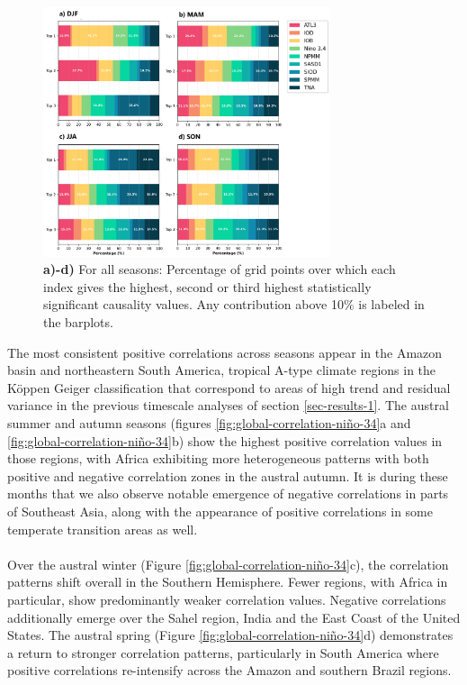 \documentclass[10pt,twocolumn]{wlscirep}
\begin{document}
\begin{figure}[!ht]
  \centering
  \includegraphics[width=0.75\textwidth]{causality_barplots.png}
  \caption{\textbf{a)-d)} For all seasons: Percentage of grid points over which each index gives the highest, second or third highest statistically significant causality values. Any contribution above 10\% is labeled in the barplots.}
  \label{fig:causality-barplots}
\end{figure}
\noindent The most consistent positive correlations across seasons appear in the Amazon basin and northeastern South America, tropical A-type climate regions in the Köppen Geiger classification that correspond to areas of high trend and residual variance in the previous timescale analyses of section \ref{sec-results-1}. The austral summer and autumn seasons (figures \ref{fig:global-correlation-niño-34}a and \ref{fig:global-correlation-niño-34}b) show the highest positive correlation values in those regions, with Africa exhibiting more heterogeneous patterns with both positive and negative correlation zones in the austral autumn. It is during these months that we also observe notable emergence of negative correlations in parts of Southeast Asia, along with the appearance of positive correlations in some temperate transition areas as well.
\\
\\
Over the austral winter (Figure \ref{fig:global-correlation-niño-34}c), the correlation patterns shift overall in the Southern Hemisphere. Fewer regions, with Africa in particular, show predominantly weaker correlation values. Negative correlations additionally emerge over the Sahel region, India and the East Coast of the United States. The austral spring (Figure \ref{fig:global-correlation-niño-34}d) demonstrates a return to stronger correlation patterns, particularly in South America where positive correlations re-intensify across the Amazon and southern Brazil regions.
\end{document}
